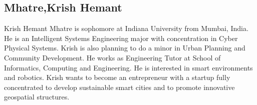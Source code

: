 \subsection{Mhatre,Krish Hemant}
Krish Hemant Mhatre is sophomore at Indiana University from Mumbai, India. 
He is an Intelligent Systems Engineering major with concentration in Cyber Physical Systems. 
Krish is also planning to do a minor in Urban Planning and Community Development. 
He works as Engineering Tutor at School of Informatics, Computing and Engineering. 
He is interested in smart environments and robotics.
Krish wants to become an entrepreneur with a startup fully concentrated to develop sustainable smart cities and to promote innovative geospatial structures. 

